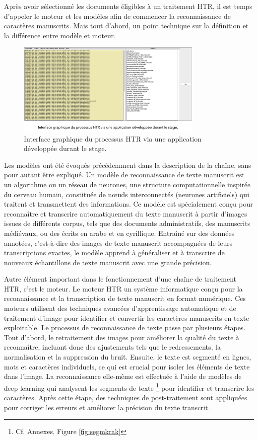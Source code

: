 \documentclass[a4paper,12pt,twoside]{book}
\begin{document}
	Après avoir sélectionné les documents éligibles à un traitement HTR, il est temps d’appeler le moteur et les modèles afin de commencer la reconnaissance de caractères manuscrits. Mais tout d’abord, un point technique sur la définition et la différence entre modèle et moteur. 
	\\
	\begin{figure}[h!]
		\centering
		\includegraphics[width=0.8\textwidth]{images/app_htr_proc.png}
		\caption{Interface graphique du processus HTR via une application développée durant le stage.}
		\label{fig:monimage}
	\end{figure}
	
	Les modèles ont été évoqués précédemment dans la description de la chaîne, sans pour autant être expliqué.  Un modèle de reconnaissance de texte manuscrit est un algorithme ou un réseau de neurones, une structure computationnelle inspirée du cerveau humain, constituée de nœuds interconnectés (neurones artificiels) qui traitent et transmettent des informations. Ce modèle est spécialement conçu pour reconnaître et transcrire automatiquement du texte manuscrit à partir d’images issues de différents corpus, tels que des documents administratifs, des manuscrits médiévaux, ou des écrits en arabe et en cyrillique. Entraîné sur des données annotées, c’est-à-dire des images de texte manuscrit accompagnées de leurs transcriptions exactes, le modèle apprend à généraliser et à transcrire de nouveaux échantillons de texte manuscrit avec une grande précision.
	
	Autre élément important dans le fonctionnement d’une chaîne de traitement HTR, c’est le moteur. Le moteur HTR un système informatique conçu pour la reconnaissance et la transcription de texte manuscrit en format numérique. Ces moteurs utilisent des techniques avancées d'apprentissage automatique et de traitement d'image pour identifier et convertir les caractères manuscrits en texte exploitable. Le processus de reconnaissance de texte passe par plusieurs étapes. Tout d’abord, le retraitement des images pour améliorer la qualité du texte à reconnaître, incluant donc des ajustements tels que le redressements, la normalisation et la suppression du bruit. Ensuite, le texte est segmenté en lignes, mots et caractères individuels, ce qui est crucial pour isoler les éléments de texte dans l'image. La reconnaissance elle-même est effectuée à l'aide de modèles de deep learning qui analysent les segments de texte \footnote{Cf. Annexes, Figure \ref{fig:segmkrak}} pour identifier et transcrire les caractères. Après cette étape, des techniques de post-traitement sont appliquées pour corriger les erreurs et améliorer la précision du texte transcrit. 
	\\
	
\end{document}
